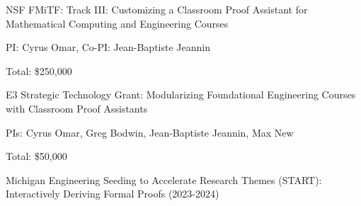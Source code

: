 \documentclass[10pt,letterpaper]{article}
\renewenvironment{itemize}{
  \begin{list}{}{
    \setlength{\leftmargin}{1.25em}
    \setlength{\itemsep}{0.25em}
    \setlength{\parskip}{0pt}
    \setlength{\parsep}{0.2em}
  }
}{
  \end{list}
}
\begin{document}
\begin{itemize}
  \item NSF FMiTF: Track III: Customizing a Classroom Proof Assistant for Mathematical Computing and Engineering Courses
    \begin{itemize}
      \item PI: Cyrus Omar, Co-PI: Jean-Baptiste Jeannin
      \item Total: \$250,000
    \end{itemize}
  \item E3 Strategic Technology Grant: 
  Modularizing Foundational Engineering Courses with Classroom Proof Assistants
    \begin{itemize}
      \item PIs: Cyrus Omar, Greg Bodwin, Jean-Baptiste Jeannin, Max New
      \item Total: \$50,000
    \end{itemize}
  \item Michigan Engineering Seeding to Accelerate Research Themes (START):
        Interactively Deriving Formal Proofs (2023-2024)

\end{itemize}
\end{document}
